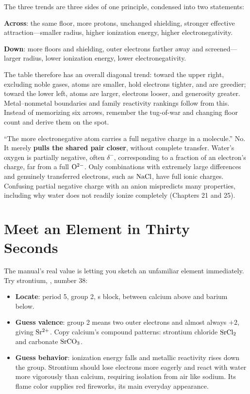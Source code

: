 \begin{qiaoliang}
The three trends are three sides of one principle, condensed into two statements:

\textbf{Across}: the same floor, more protons, unchanged shielding, stronger effective attraction---smaller radius, higher ionization energy, higher electronegativity.

\textbf{Down}: more floors and shielding, outer electrons farther away and screened---larger radius, lower ionization energy, lower electronegativity.

The table therefore has an overall diagonal trend: toward the upper right, excluding noble gases, atoms are smaller, hold electrons tighter, and are greedier; toward the lower left, atoms are larger, electrons looser, and generosity greater. Metal--nonmetal boundaries and family reactivity rankings follow from this. Instead of memorizing six arrows, remember the tug-of-war and changing floor count and derive them on the spot.
\end{qiaoliang}

\begin{wuqu}
``The more electronegative atom carries a full negative charge in a molecule.'' No. It merely \textbf{pulls the shared pair closer}, without complete transfer. Water's oxygen is partially negative, often $\delta^-$, corresponding to a fraction of an electron's charge, far from a full $\mathrm{O^{2-}}$. Only combinations with extremely large differences and genuinely transferred electrons, such as $\mathrm{NaCl}$, have full ionic charges. Confusing partial negative charge with an anion mispredicts many properties, including why water does not readily ionize completely (Chapters 21 and 25).
\end{wuqu}

\section{Meet an Element in Thirty Seconds}

The manual's real value is letting you sketch an unfamiliar element immediately. Try strontium, , number 38:

\begin{itemize}[itemsep=2pt]
\item \textbf{Locate}: period 5, group 2, s block, between calcium above and barium below.
\item \textbf{Guess valence}: group 2 means two outer electrons and almost always $+2$, giving $\mathrm{Sr^{2+}}$. Copy calcium's compound patterns: strontium chloride $\mathrm{SrCl_2}$ and carbonate $\mathrm{SrCO_3}$.
\item \textbf{Guess behavior}: ionization energy falls and metallic reactivity rises down the group. Strontium should lose electrons more eagerly and react with water more vigorously than calcium, requiring isolation from air like sodium. Its flame color supplies red fireworks, its main everyday appearance.
\end{itemize}

